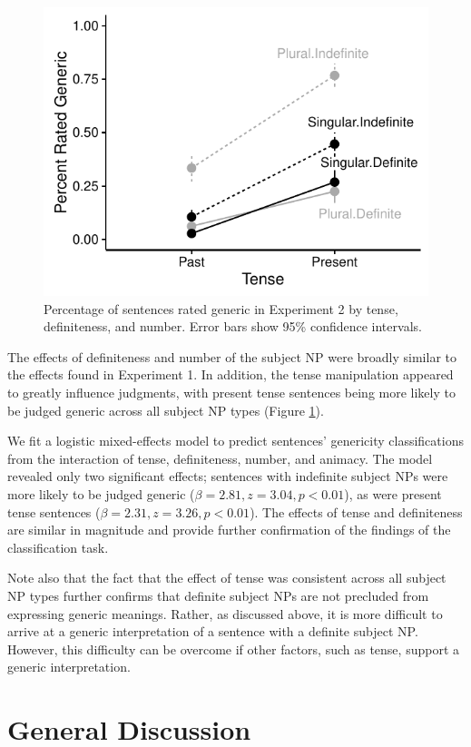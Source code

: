 \documentclass[10pt,letterpaper]{article}
\begin{document}
\begin{figure}[t]
\centering
\includegraphics[width=.8\linewidth]{figures/tense.pdf}
\caption{\label{fig:tense} Percentage of sentences rated generic in Experiment 2 by tense, definiteness, and number. Error bars show 95\% confidence intervals.}
\end{figure}

The effects of definiteness and number of the subject NP were broadly similar to the effects found in Experiment 1. In addition, the tense manipulation appeared to greatly influence judgments, with present tense sentences being more likely to be judged generic across all subject NP types (Figure \ref{fig:tense}).

We fit a logistic mixed-effects model to predict sentences' genericity classifications from the interaction of tense, definiteness, number, and animacy. The model revealed only two significant effects; sentences with indefinite subject NPs were more likely to be judged generic (\(\beta = 2.81, z = 3.04, p < 0.01\)), as were present tense sentences (\(\beta = 2.31, z = 3.26, p < 0.01\)). The effects of tense and definiteness are similar in magnitude and provide further confirmation of the findings of the classification task.

Note also that the fact that the effect of tense was consistent across all subject NP types further confirms that definite subject NPs are not precluded from expressing generic meanings. Rather, as discussed above, it is more difficult to arrive at a generic interpretation of a sentence with a definite subject NP. However, this difficulty can be overcome if other factors, such as tense, support a generic interpretation.

\section{General Discussion}
\end{document}
